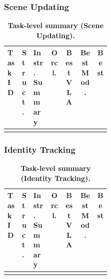 \subsubsection{Scene Updating}
\begin{table}[t]
  \centering
  \footnotesize
  \begin{tabularx}{\columnwidth}{p{0.14\linewidth} p{0.10\linewidth} X c c c c}
    \toprule
    \rowcolor{HeaderGray}
    Task ID & Struct. & Instr. Summary & Orcl. & Best VLA & Best Mod. & Best \\
    \midrule
    \TODO{} & \TODO{} & \TODO{} & \TODO{} & \TODO{} & \TODO{} & \TODO{} \\
    \bottomrule
  \end{tabularx}
  \caption{\textbf{Task-level summary (Scene Updating).}}
  \label{tab:app_task_scene_compact}
\end{table}

\subsubsection{Identity Tracking}
\begin{table}[t]
  \centering
  \footnotesize
  \begin{tabularx}{\columnwidth}{p{0.14\linewidth} p{0.10\linewidth} X c c c c}
    \toprule
    \rowcolor{HeaderGray}
    Task ID & Struct. & Instr. Summary & Orcl. & Best VLA & Best Mod. & Best \\
    \midrule
    \TODO{} & \TODO{} & \TODO{} & \TODO{} & \TODO{} & \TODO{} & \TODO{} \\
    \bottomrule
  \end{tabularx}
  \caption{\textbf{Task-level summary (Identity Tracking).}}
  \label{tab:app_task_track_compact}
\end{table}

